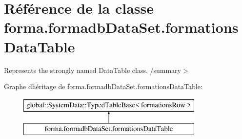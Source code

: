 \hypertarget{classforma_1_1formadb_data_set_1_1formations_data_table}{}\section{Référence de la classe forma.\+formadb\+Data\+Set.\+formations\+Data\+Table}
\label{classforma_1_1formadb_data_set_1_1formations_data_table}


Represents the strongly named Data\+Table class. /summary$>$  


Graphe d\textquotesingle{}héritage de forma.\+formadb\+Data\+Set.\+formations\+Data\+Table\+:\begin{figure}[H]
\begin{center}
\leavevmode
\includegraphics[height=2.000000cm]{classforma_1_1formadb_data_set_1_1formations_data_table}
\end{center}
\end{figure}
